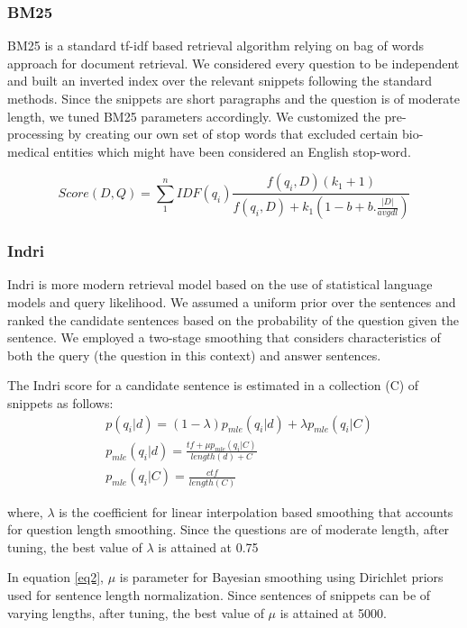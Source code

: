 \subsubsection*{BM25}
BM25 \cite{BM25} is a standard tf-idf based retrieval algorithm relying on bag of words approach for document retrieval. We considered every question to be independent and built an inverted index over the relevant snippets following the standard methods. Since the snippets are short paragraphs and the question is of moderate length, we tuned BM25 parameters accordingly. We customized the pre-processing by creating our own set of stop words that excluded certain bio-medical entities which might have been considered an English stop-word.

\[Score(D, Q) = \sum_1^n IDF(q_i) \frac{f(q_i, D) (k_1 + 1)}{f(q_i, D) + k_1 (1- b + b . \frac{|D|}{avgdl})} \]



\subsubsection*{Indri}

Indri \cite{Indri} is more modern retrieval model based on the use of statistical language models and query likelihood. We assumed a uniform prior over the sentences and ranked the candidate sentences based on the probability of the question given the sentence. 
We employed a two-stage smoothing that considers characteristics of both the query (the question in this context) and answer sentences. 

The Indri score for a candidate sentence is estimated in a collection (C) of snippets as follows:
\begin{align}
    & p(q_i|d) = (1-\lambda) p_{mle} (q_i|d) + \lambda p_{mle} (q_i|C) \label{eq1} \\ 
    & p_{mle}(q_i|d) = 
    \frac{tf + \mu  p_{mle}(q_i|C)}{length(d) + C} \label{eq2} \\ 
    & p_{mle}(q_i | C) = \frac{ctf}{length(C)}
\end{align}

where, $\lambda$ is the coefficient for linear interpolation based smoothing that accounts for question length smoothing. Since the questions are of moderate length, after tuning, the best value of $\lambda$ is attained at 0.75

In equation \ref{eq2}, $\mu$ is parameter for Bayesian smoothing using Dirichlet priors used for sentence length normalization. Since sentences of snippets can be of varying lengths, after tuning, the best value of $\mu$ is attained at 5000.


